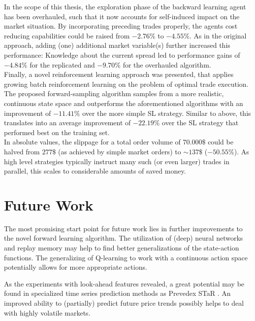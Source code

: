 In the scope of this thesis, the exploration phase of the backward learning agent has been overhauled, such that it now accounts for self-induced impact on the market situation. By incorporating preceding trades properly, the agents cost reducing capabilities could be raised from $-2.76\%$ to $-4.55\%$. As in the original approach, adding (one) additional market variable(s) further increased this performance: Knowledge about the current spread led to performance gains of $-4.84\%$ for the replicated and $-9.70\%$ for the overhauled algorithm.\\

Finally, a novel reinforcement learning approach was presented, that applies growing batch reinforcement learning on the problem of optimal trade execution. The proposed forward-sampling algorithm samples from a more realistic, continuous state space and outperforms the aforementioned algorithms with an improvement of $-11.41\%$ over the more simple \ac{SL} strategy. Similar to above, this translates into an average improvement of $-22.19\%$ over the \ac{SL} strategy that performed best on the training set.\\

In absolute values, the slippage for a total order volume of $70.000\$$ could be halved from $277\$$ (as achieved by simple market orders) to $\sim137\$$ ($-50.55\%$). As high level strategies typically instruct many such (or even larger) trades in parallel, this scales to considerable amounts of saved money.





\section{Future Work}
The most promising start point for future work lies in further improvements to the novel forward learning algorithm. The utilization of (deep) neural networks and replay memory may help to find better generalizations of the state-action functions. The generalizing of Q-learning to work with a continuous action space potentially allows for more appropriate actions. 

As the experiments with look-ahead features revealed, a great potential may be found in specialized time series prediction methods as \eg Prevedex STaR \Cite{STAR}. An improved ability to (partially) predict future price trends possibly helps to deal with highly volatile markets.

